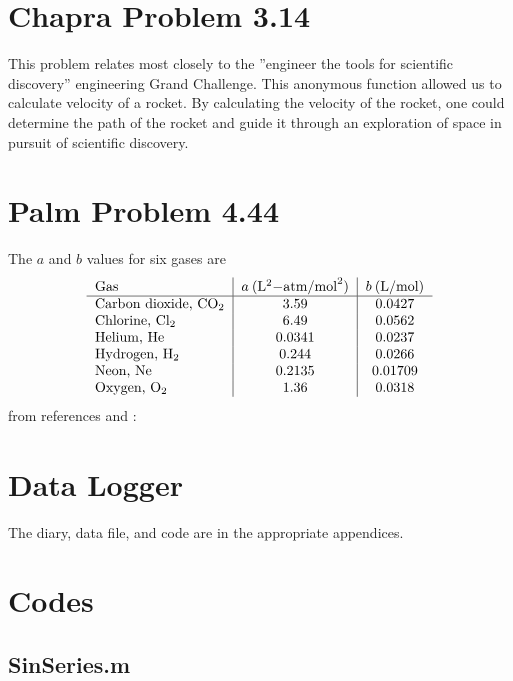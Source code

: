 \documentclass{article}
\begin{document}
\section{Chapra Problem 3.14}
This problem relates most closely to the ''engineer the tools for scientific discovery'' engineering Grand Challenge. This anonymous function allowed us to calculate velocity of a rocket. By calculating the velocity of the rocket, one could determine the path of the rocket and guide it through an exploration of space in pursuit of scientific discovery. 
\section{Palm Problem 4.44}
\renewcommand{\arraystretch}{1.3}
The $a$ and $b$ values for six gases are
\[
\begin{tabular}{l|c|c}
Gas & $a\: (\mathrm{ L}^2\mathrm{-atm/mol}^2)$ & $b\: (\mathrm{ L/mol})$\\ \hline
Carbon dioxide, CO$_2$ & 3.59 & 0.0427\\
Chlorine, Cl$_2$ & 6.49 & 0.0562\\
Helium, He & 0.0341 & 0.0237\\
Hydrogen, H$_2$ & 0.244 & 0.0266\\
Neon, Ne & 0.2135 & 0.01709\\
Oxygen, O$_2$ & 1.36 & 0.0318
\end{tabular}
\]
 from
references \cite{Palm} and \cite{Other}:

\section{Data Logger}
The diary, data file, and code are in the appropriate appendices.


\pagebreak
\appendix
\section{Codes}


\subsection{SinSeries.m}
\end{document}

